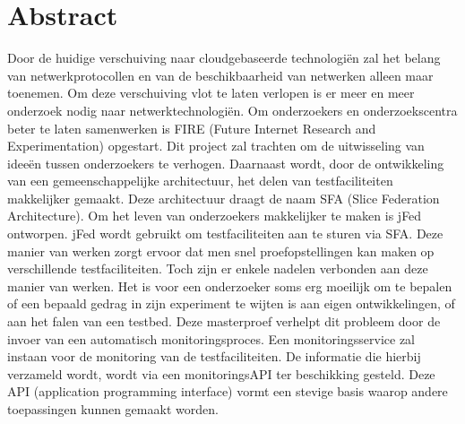 \newpage
\chapter*{Abstract}
\npar
Door de huidige verschuiving naar cloudgebaseerde technologi\"en zal het belang 
van netwerkprotocollen en van de beschikbaarheid van netwerken alleen maar toenemen.
Om deze verschuiving vlot te laten verlopen is er meer en meer onderzoek nodig naar netwerktechnologi\"en.
Om onderzoekers en onderzoekscentra beter te laten samenwerken is FIRE (Future Internet Research and Experimentation) opgestart. Dit project zal trachten om de uitwisseling van ideeën tussen onderzoekers te verhogen. Daarnaast wordt, door de ontwikkeling van een gemeenschappelijke architectuur,  het delen van testfaciliteiten makkelijker gemaakt. Deze architectuur draagt de naam SFA (Slice Federation Architecture). Om het leven van onderzoekers makkelijker te maken is jFed ontworpen. jFed wordt gebruikt om testfaciliteiten aan te sturen via SFA. Deze manier van werken zorgt ervoor dat men snel proefopstellingen kan maken op verschillende testfaciliteiten. Toch zijn er enkele nadelen verbonden aan deze manier van werken. Het is voor een onderzoeker soms erg moeilijk om te bepalen of een bepaald gedrag in zijn experiment te wijten is aan eigen ontwikkelingen, of aan het falen van een testbed.
\npar
Deze masterproef verhelpt dit probleem door de invoer van een automatisch monitoringsproces. Een monitoringsservice zal instaan voor de monitoring van de testfaciliteiten. De informatie die hierbij verzameld wordt, wordt via een monitoringsAPI ter beschikking gesteld. Deze API (application programming interface) vormt een stevige basis waarop andere toepassingen kunnen gemaakt worden.